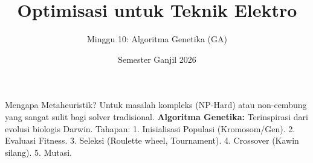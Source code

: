 \documentclass[aspectratio=169]{beamer}
\title{Optimisasi untuk Teknik Elektro}\subtitle{Minggu 10: Algoritma Genetika (GA)}
\date{Semester Ganjil 2026}
\begin{document}
\begin{frame}\titlepage\end{frame}
\begin{frame}{Mengapa Metaheuristik?}
Untuk masalah kompleks (NP-Hard) atau non-cembung yang sangat sulit bagi solver tradisional.
\textbf{Algoritma Genetika:} Terinspirasi dari evolusi biologis Darwin.
Tahapan:
1. Inisialisasi Populasi (Kromosom/Gen).
2. Evaluasi Fitness.
3. Seleksi (Roulette wheel, Tournament).
4. Crossover (Kawin silang).
5. Mutasi.
\end{frame}
\end{document}
